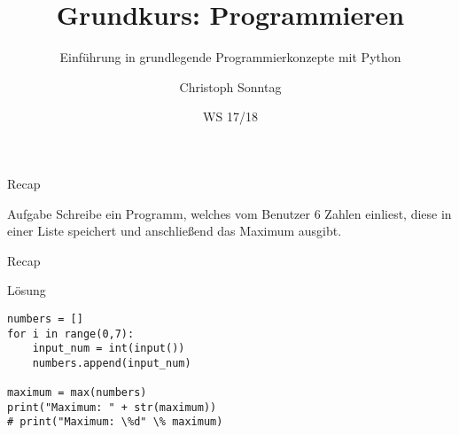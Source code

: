 \documentclass{beamer}
\title{Grundkurs: Programmieren}
\subtitle{Einführung in grundlegende Programmierkonzepte mit Python}
\date{WS 17/18}
\author[CS]{Christoph Sonntag}
\institute{Universität Passau}
\begin{document}
\maketitle














\begin{frame}{Recap}
    \begin{block}{Aufgabe}
        Schreibe ein Programm, welches vom Benutzer 6 Zahlen einliest, diese 
        in einer Liste speichert und anschließend das Maximum ausgibt.
    \end{block}
\end{frame}

\begin{frame}[fragile]{Recap}
    \begin{exampleblock}{Lösung}
        \begin{lstlisting}
numbers = []
for i in range(0,7):
    input_num = int(input())
    numbers.append(input_num)

maximum = max(numbers)
print("Maximum: " + str(maximum))
# print("Maximum: \%d" \% maximum)
        \end{lstlisting}
    \end{exampleblock}
\end{frame}




% 


% 



\end{document}
